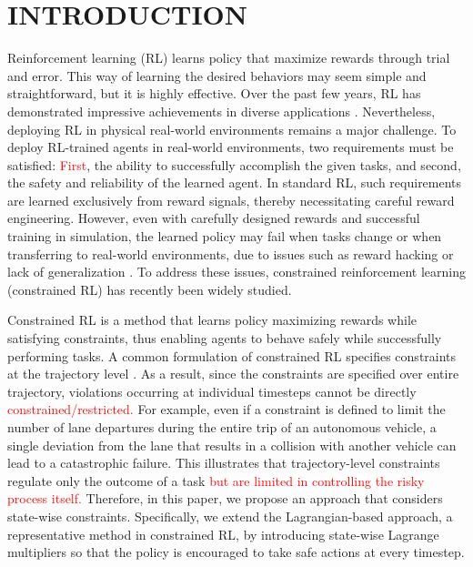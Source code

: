 \section{INTRODUCTION}

Reinforcement learning (RL) learns policy that maximize rewards through trial and error.
This way of learning the desired behaviors may seem simple and straightforward, but it is highly effective.
Over the past few years, RL has demonstrated impressive achievements in diverse applications \cite{silver2017mastering} \cite{andrychowicz2020learning} \cite{ouyang2022training}.
Nevertheless, deploying RL in physical real-world environments remains a major challenge.
To deploy RL-trained agents in real-world environments, two requirements must be satisfied:
\textcolor{red}{First}, the ability to successfully accomplish the given tasks, and second, the safety and reliability of the learned agent.
In standard RL, such requirements are learned exclusively from reward signals, thereby necessitating careful reward engineering.
However, even with carefully designed rewards and successful training in simulation, the learned policy may fail when tasks change or when transferring to real-world environments, due to issues such as reward hacking or lack of generalization \cite{amodei2016concrete}.
To address these issues, constrained reinforcement learning (constrained RL) has recently been widely studied.

Constrained RL is a method that learns policy maximizing rewards while satisfying constraints, thus enabling agents to behave safely while successfully performing tasks.
A common formulation of constrained RL specifies constraints at the trajectory level \cite{brunke2022safe}.
As a result, since the constraints are specified over entire trajectory, violations occurring at individual timesteps cannot be directly \textcolor{red}{constrained/restricted.}
For example, even if a constraint is defined to limit the number of lane departures during the entire trip of an autonomous vehicle, a single deviation from the lane that results in a collision with another vehicle can lead to a catastrophic failure.
This illustrates that trajectory-level constraints regulate only the outcome of a task \textcolor{red}{but are limited in controlling the risky process itself.}
Therefore, in this paper, we propose an approach that considers state-wise constraints.
Specifically, we extend the Lagrangian-based approach, a representative method in constrained RL, by introducing state-wise Lagrange multipliers so that the policy is encouraged to take safe actions at every timestep.